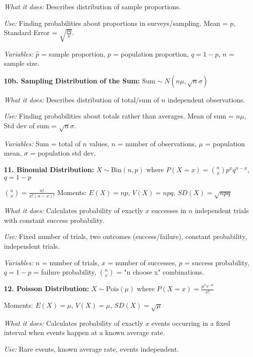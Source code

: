 \documentclass[10pt]{extarticle}
\begin{document}
\begin{multicol}{2}
\textit{What it does:} Describes distribution of sample proportions. 

\textit{Use:} Finding probabilities about proportions in surveys/sampling. Mean = $p$, Standard Error = $\sqrt{\frac{pq}{n}}$. 

\textit{Variables:} $\hat{p}$ = sample proportion, $p$ = population proportion, $q = 1-p$, $n$ = sample size.

\vspace{3pt}

\textbf{10b. Sampling Distribution of the Sum:} $\text{Sum} \sim N(n\mu, \sqrt{n}\sigma)$

\textit{What it does:} Describes distribution of total/sum of $n$ independent observations. 

\textit{Use:} Finding probabilities about totals rather than averages. Mean of sum = $n\mu$, Std dev of sum = $\sqrt{n}\sigma$. 

\textit{Variables:} Sum = total of $n$ values, $n$ = number of observations, $\mu$ = population mean, $\sigma$ = population std dev.

\vspace{3pt}

\textbf{11. Binomial Distribution:} $X \sim \text{Bin}(n, p)$ where $P(X=x) = \binom{n}{x}p^xq^{n-x}$, $q = 1-p$

$\binom{n}{x} = \frac{n!}{x!(n-x)!}$ \quad Moments: $E(X)=np$, $V(X)=npq$, $SD(X)=\sqrt{npq}$

\textit{What it does:} Calculates probability of exactly $x$ successes in $n$ independent trials with constant success probability. 

\textit{Use:} Fixed number of trials, two outcomes (success/failure), constant probability, independent trials. 

\textit{Variables:} $n$ = number of trials, $x$ = number of successes, $p$ = success probability, $q = 1-p$ = failure probability, $\binom{n}{x}$ = "n choose x" combinations.

\vspace{3pt}

\textbf{12. Poisson Distribution:} $X \sim \text{Pois}(\mu)$ where $P(X=x) = \frac{\mu^x e^{-\mu}}{x!}$

Moments: $E(X)=\mu$, $V(X)=\mu$, $SD(X)=\sqrt{\mu}$

\textit{What it does:} Calculates probability of exactly $x$ events occurring in a fixed interval when events happen at a known average rate. 

\textit{Use:} Rare events, known average rate, events independent. 


\end{multicol}
\end{document}
